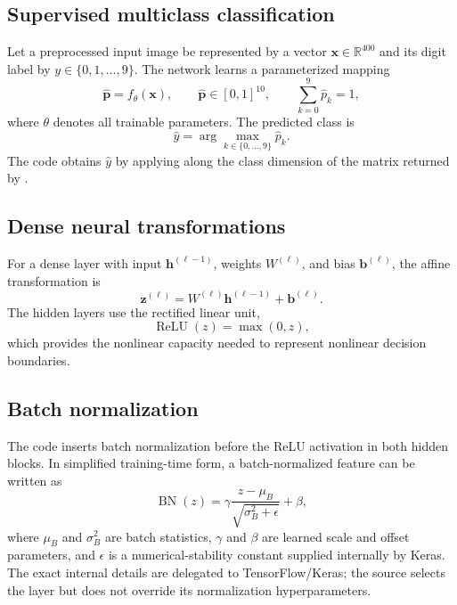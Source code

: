 \documentclass[11pt,a4paper]{article}
\newcommand{\code}[1]{\texttt{\detokenize{#1}}}
\newcommand{\R}{\mathbb{R}}
\begin{document}
\subsection{Supervised multiclass classification}
Let a preprocessed input image be represented by a vector $\mathbf{x}\in\R^{400}$ and its digit label by $y\in\{0,1,\ldots,9\}$. The network learns a parameterized mapping
\begin{equation}
\hat{\mathbf{p}} = f_{\theta}(\mathbf{x}), \qquad \hat{\mathbf{p}}\in[0,1]^{10}, \qquad \sum_{k=0}^{9}\hat{p}_k=1,
\end{equation}
where $\theta$ denotes all trainable parameters. The predicted class is
\begin{equation}
\hat{y}=\arg\max_{k\in\{0,\ldots,9\}}\hat{p}_k.
\end{equation}
The code obtains $\hat{y}$ by applying \code{numpy.argmax} along the class dimension of the matrix returned by \code{model.predict}.

\subsection{Dense neural transformations}
For a dense layer with input $\mathbf{h}^{(\ell-1)}$, weights $W^{(\ell)}$, and bias $\mathbf{b}^{(\ell)}$, the affine transformation is
\begin{equation}
\mathbf{z}^{(\ell)}=W^{(\ell)}\mathbf{h}^{(\ell-1)}+\mathbf{b}^{(\ell)}.
\end{equation}
The hidden layers use the rectified linear unit,
\begin{equation}
\operatorname{ReLU}(z)=\max(0,z),
\end{equation}
which provides the nonlinear capacity needed to represent nonlinear decision boundaries.

\subsection{Batch normalization}
The code inserts batch normalization before the ReLU activation in both hidden blocks. In simplified training-time form, a batch-normalized feature can be written as
\begin{equation}
\operatorname{BN}(z)=\gamma\frac{z-\mu_B}{\sqrt{\sigma_B^2+\epsilon}}+\beta,
\end{equation}
where $\mu_B$ and $\sigma_B^2$ are batch statistics, $\gamma$ and $\beta$ are learned scale and offset parameters, and $\epsilon$ is a numerical-stability constant supplied internally by Keras. The exact internal details are delegated to TensorFlow/Keras; the source selects the layer but does not override its normalization hyperparameters.
\end{document}
